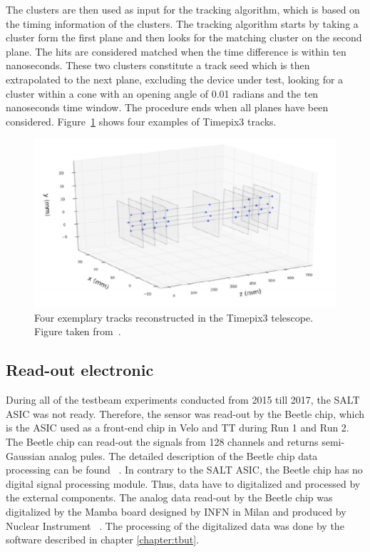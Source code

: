 The clusters are then used as input for the tracking algorithm, which is based on the timing information of the clusters.  The tracking algorithm starts by taking a cluster form the first plane and then looks for the matching cluster on the second plane. The hits are considered matched when the time difference is within ten nanoseconds. These two clusters constitute a track seed which is then extrapolated to the next plane, excluding the device under test, looking for a cluster within a cone with an opening angle of 0.01 radians and the ten nanoseconds time window. The procedure ends when all planes have been considered. Figure~\ref{fig:telescope_tracks} shows four examples of Timepix3 tracks. 



\begin{figure}
\centering
\includegraphics[scale=0.9]{figures/telescope_tracks.png}
\caption{Four exemplary tracks reconstructed in the Timepix3 telescope. Figure taken from~\cite{Sophie}.}
\label{fig:telescope_tracks}
\end{figure}


\subsection{Read-out electronic}
During all of the testbeam experiments conducted from 2015 till 2017, the SALT ASIC was not ready. Therefore, the sensor was read-out by the Beetle chip, which is the ASIC used as a front-end chip in Velo and TT during Run 1 and Run 2. The Beetle chip can read-out the signals from 128 channels and returns semi-Gaussian analog pules. The detailed description of the Beetle chip data processing can be found ~\cite{Beetle}. In contrary to the SALT ASIC, the Beetle chip has no digital signal processing module. Thus, data have to digitalized and processed by the external components.  
The analog data read-out by the Beetle chip was digitalized by the Mamba board designed by INFN in Milan and produced by Nuclear Instrument ~\cite{NuclearInstruments}.   
The processing of the digitalized data was done by the software described in chapter \ref{chapter:tbut}. 

